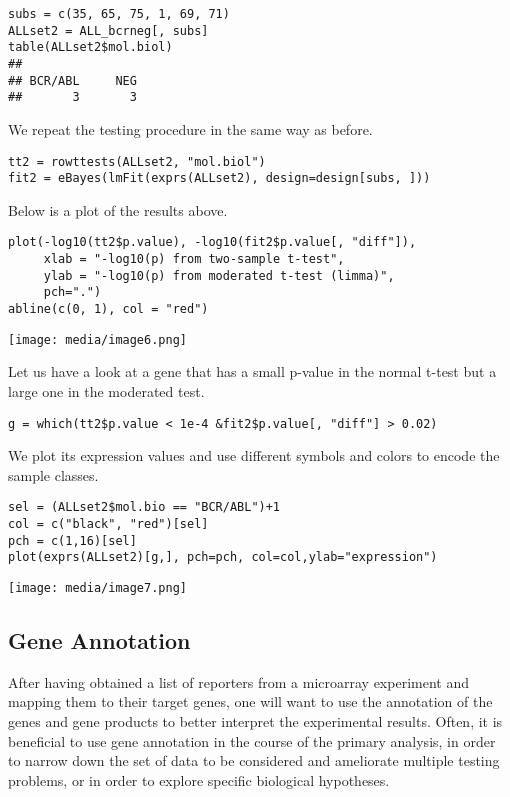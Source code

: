 \begin{verbatim}
subs = c(35, 65, 75, 1, 69, 71)
ALLset2 = ALL_bcrneg[, subs]
table(ALLset2$mol.biol)
## 
## BCR/ABL     NEG 
##       3       3
\end{verbatim}

We repeat the testing procedure in the same way as before.

\begin{verbatim}
tt2 = rowttests(ALLset2, "mol.biol")
fit2 = eBayes(lmFit(exprs(ALLset2), design=design[subs, ]))
\end{verbatim}

Below is a plot of the results above.

\begin{verbatim}
plot(-log10(tt2$p.value), -log10(fit2$p.value[, "diff"]),
     xlab = "-log10(p) from two-sample t-test",
     ylab = "-log10(p) from moderated t-test (limma)",
     pch=".")
abline(c(0, 1), col = "red")
\end{verbatim}

\texttt{[image: media/image6.png]}

Let us have a look at a gene that has a small p-value in the normal
t-test but a large one in the moderated test.

\begin{verbatim}
g = which(tt2$p.value < 1e-4 &fit2$p.value[, "diff"] > 0.02)
\end{verbatim}

We plot its expression values and use different symbols and colors to
encode the sample classes.

\begin{verbatim}
sel = (ALLset2$mol.bio == "BCR/ABL")+1
col = c("black", "red")[sel]
pch = c(1,16)[sel]
plot(exprs(ALLset2)[g,], pch=pch, col=col,ylab="expression")
\end{verbatim}

\texttt{[image: media/image7.png]}

\hypertarget{gene-annotation}{%
\subsection{Gene Annotation}\label{gene-annotation}}

After having obtained a list of reporters from a microarray experiment
and mapping them to their target genes, one will want to use the
annotation of the genes and gene products to better interpret the
experimental results. Often, it is beneficial to use gene annotation in
the course of the primary analysis, in order to narrow down the set of
data to be considered and ameliorate multiple testing problems, or in
order to explore specific biological hypotheses.

